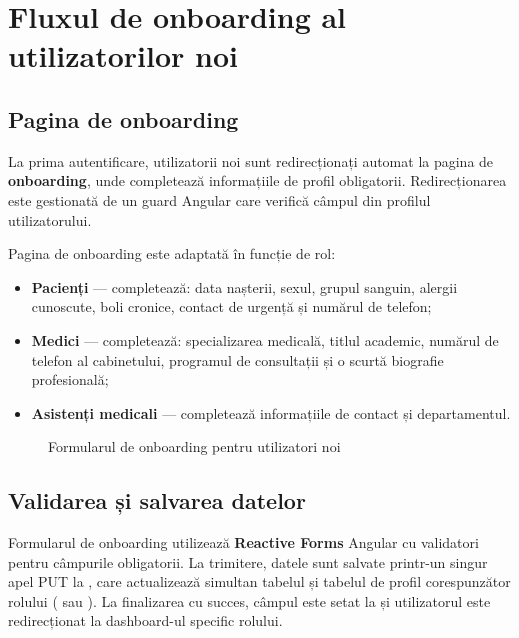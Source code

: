 \section{Fluxul de onboarding al utilizatorilor noi}

\subsection{Pagina de onboarding}

La prima autentificare, utilizatorii noi sunt redirecționați automat la pagina de \textbf{onboarding}, unde completează informațiile de profil obligatorii. Redirecționarea este gestionată de un guard Angular care verifică câmpul  din profilul utilizatorului.

Pagina de onboarding este adaptată în funcție de rol:

\begin{itemize}
  \item \textbf{Pacienți} --- completează: data nașterii, sexul, grupul sanguin, alergii cunoscute, boli cronice, contact de urgență și numărul de telefon;
  \item \textbf{Medici} --- completează: specializarea medicală, titlul academic, numărul de telefon al cabinetului, programul de consultații și o scurtă biografie profesională;
  \item \textbf{Asistenți medicali} --- completează informațiile de contact și departamentul.
\end{itemize}

\begin{figure}[H]
  \centering
  \caption{Formularul de onboarding pentru utilizatori noi}
  \label{fig:onboarding}
\end{figure}

\subsection{Validarea și salvarea datelor}

Formularul de onboarding utilizează \textbf{Reactive Forms} Angular cu validatori pentru câmpurile obligatorii. La trimitere, datele sunt salvate printr-un singur apel PUT la , care actualizează simultan tabelul  și tabelul de profil corespunzător rolului ( sau ). La finalizarea cu succes, câmpul  este setat la  și utilizatorul este redirecționat la dashboard-ul specific rolului.

